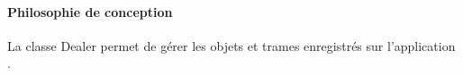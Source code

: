  \paragraph{Philosophie de conception}
La classe Dealer permet de gérer les objets et trames enregistrés sur l'application {\nomApplication}.\\